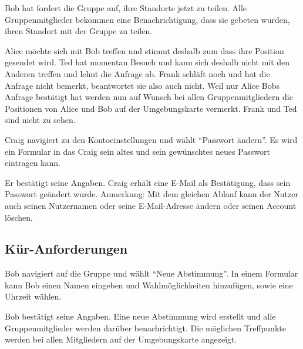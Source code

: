 \documentclass[parskip=full,11pt]{scrartcl}
\begin{document}
{Bob hat fordert die Gruppe auf, ihre Standorte jetzt	 zu teilen.}
{Alle Gruppenmitglieder bekommen eine Benachrichtigung, dass sie gebeten wurden, ihren Standort
mit der Gruppe zu teilen.}

{Alice möchte sich mit Bob treffen und stimmt deshalb zum dass ihre Position gesendet wird.
Ted hat momentan Besuch und kann sich deshalb nicht mit den Anderen treffen und lehnt die
Anfrage ab. Frank schläft noch und hat die Anfrage nicht bemerkt, beantwortet sie also auch nicht.}
{Weil nur Alice Bobs Anfrage bestätigt hat werden nun auf Wunsch bei allen Gruppenmitgliedern
die Positionen von Alice und Bob auf der Umgebungskarte vermerkt. Frank und Ted sind nicht zu sehen.}


{Craig navigiert zu den Kontoeinstellungen und wählt \enquote{Passwort ändern}.}
{Es wird ein Formular in das Craig sein altes und sein gewünschtes neues Passwort eintragen kann.}

{Er bestätigt seine Angaben.}
{Craig erhält eine E-Mail als Bestätigung, dass sein Passwort geändert wurde.}
Anmerkung: Mit dem gleichen Ablauf kann der Nutzer auch seinen Nutzernamen oder seine
E-Mail-Adresse ändern oder seinen Account löschen.


\subsection{Kür-Anforderungen}
{Bob navigiert auf die Gruppe und wählt \enquote{Neue Abstimmung}.}
{In einem Formular kann Bob einen Namen eingeben und Wahlmöglichkeiten hinzufügen,
	sowie eine Uhrzeit wählen.}

{Bob bestätigt seine Angaben.}
{Eine neue Abstimmung wird erstellt und alle Gruppenmitglieder werden darüber benachrichtigt.
Die möglichen Treffpunkte werden bei allen Mitgliedern auf der Umgebungskarte angezeigt.}
\end{document}
